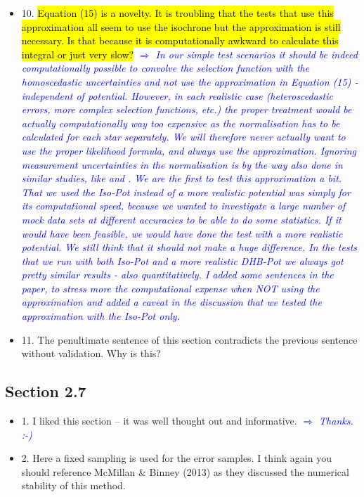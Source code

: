 \documentclass[10pt,a4paper]{article}
\newcommand{\Comment}[1]{\textsl{\textcolor{Blue}{$\Longrightarrow$ {#1}}}}
\begin{document}
\begin{itemize}
\item 10. \hl{Equation (15) is a novelty. It is troubling that the tests that use this approximation all seem to use the isochrone but the approximation is still necessary. Is that because it is computationally awkward to calculate this integral or just very slow?} \Comment{In our simple test scenarios it should be indeed computationally possible to convolve the selection function with the homoscedastic uncertainties and not use the approximation in Equation (15) - independent of potential. However, in each realistic case (heteroscedastic errors, more complex selection functions, etc.) the proper treatment would be actually computationally way too expensive as the normalisation has to be calculated for each star separately. We will therefore never actually want to use the proper likelihood formula, and always use the approximation. Ignoring measurement uncertainties in the normalisation is by the way also done in similar studies, like \citet{2013MNRAS.433.1411M} and \citet{2016arXiv160309332D}. We are the first to test this approximation a bit. That we used the Iso-Pot instead of a more realistic potential was simply for its computational speed, because we wanted to investigate a large number of mock data sets at different accuracies to be able to do some statistics. If it would have been feasible, we would have done the test with a more realistic potential. We still think that it should not make a huge difference. In the tests that we run with both Iso-Pot and a more realistic DHB-Pot we always got pretty similar results - also quantitatively. I added some sentences in the paper, to stress more the computational expense when NOT using the approximation and added a caveat in the discussion that we tested the approximation with the Iso-Pot only.}
\item 11. The penultimate sentence of this section contradicts the previous sentence without validation. Why is this?
\end{itemize}

\subsection{Section 2.7}
\begin{itemize}
\item 1. I liked this section -- it was well thought out and informative. \Comment{Thanks. :-)}
\item 2. Here a fixed sampling is used for the error samples. I think again you should reference McMillan \& Binney (2013) as they discussed the numerical stability of this method.
\end{itemize}
\end{document}
